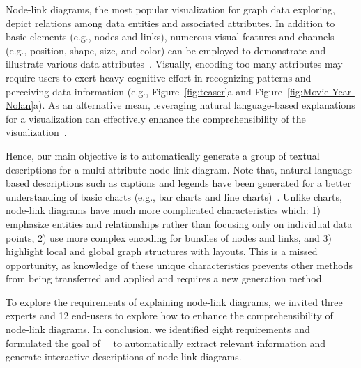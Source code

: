 \maketitle

Node-link diagrams, the most popular visualization for graph data exploring, depict relations among data entities and associated attributes. 
In addition to basic elements (e.g., nodes and links), numerous visual features and channels (e.g., position, shape, size, and color) can be employed to demonstrate and illustrate various data attributes~\cite{DBLP:conf/infovis/AuberCJM03, tvcg/RomatAP21, DBLP:conf/infovis/Jankun-KellyM03, DBLP:conf/iv/SchoffelSE16}.
Visually, encoding too many attributes may require users to exert heavy cognitive effort in recognizing patterns and perceiving data information (e.g., Figure~\ref{fig:teaser}a and Figure~\ref{fig:Movie-Year-Nolan}a).
As an alternative mean, leveraging natural language-based explanations for a visualization can effectively enhance the comprehensibility of the visualization~\cite{DBLP:conf/chi/KimHA20, DBLP:conf/eccv/KembhaviSKSHF16, DBLP:conf/cvpr/KaflePCK18, DBLP:journals/coling/MittalMCR98, DBLP:journals/tochi/FerresLST13}.


Hence, our main objective is to automatically generate a group of textual descriptions for a multi-attribute node-link diagram.
Note that, natural language-based descriptions such as captions and legends have been generated for a better understanding of basic charts (e.g., bar charts and line charts)~\cite{DBLP:conf/apvis/LiuXHWY20, DBLP:conf/nips/VaswaniSPUJGKP17, DBLP:conf/inlg/ObeidH20}. 
Unlike charts, node-link diagrams have much more complicated characteristics which: 1) emphasize entities and relationships rather than focusing only on individual data points, 2) use more complex encoding for bundles of nodes and links, and 3)  highlight local and global graph structures with layouts. This is a missed opportunity, as knowledge of these unique characteristics prevents other methods from being transferred and applied and requires a new generation method.



To explore the requirements of explaining node-link diagrams, we invited three experts and 12 end-users to explore how to enhance the comprehensibility of node-link diagrams. In conclusion, we identified eight requirements and formulated the goal of~\ApproachName~ to automatically extract relevant information and generate interactive descriptions of node-link diagrams.

